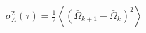 \documentclass[preview, border=8pt, 12pt]{standalone}
\begin{document}
$\displaystyle 
\sigma^2_A(\tau) = \frac{1}{2}\left\langle (\bar{\Omega}_{k+1} - \bar{\Omega}_k)^2 \right\rangle
$
\end{document}
